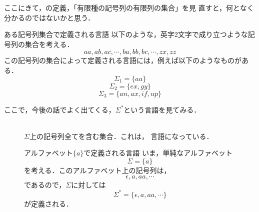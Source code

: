 ここにきて，の定義，「有限種の記号列の有限列の集合」を見
直すと，何となく分かるのではないかと思う．
\begin{myexample}{ある記号列集合で定義される言語}
 以下のような，英字2文字で成り立つような記号列の集合を考える．
 \[
  aa, ab, ac, \cdots , ba, bb, bc, \cdots , zx, zz
 \]
 この記号列の集合によって定義される言語には，例えば以下のようなものがあ
 る．
 \[
  \Sigma_1 = \{aa\}
 \]
 \[
  \Sigma_2 = \{ex, gy\}
 \]
 \[
  \Sigma_3 = \{an, ax, if, up\}
 \]
\end{myexample}

ここで，今後の話でよく出てくる，$\Sigma^*$という言語を見てみる．
\begin{description}
 \item [\mystrong{$\Sigma^*$}] \mbox{} \\
 $\Sigma$上の記号列全てを含む集合．これは，
            言語になっている．
            \begin{myexample}{アルファベット$\{a\}$で定義される言語}
             いま，単純なアルファベット
             \[
              \Sigma = \{a\}
             \]
             を考える．このアルファベット上の記号列は，
             \[
              \epsilon, a, aa, \cdots 
             \]
             であるので，$\Sigma$に対しては
             \[
              \Sigma^* = \{\epsilon, a, aa, \cdots \}
             \]
             が定義される．
            \end{myexample}
\end{description}

